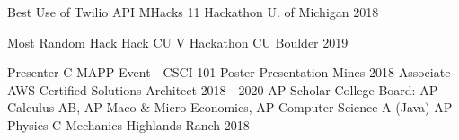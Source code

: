 

\begin{cvhonors}

  \cvhonor
    {Best Use of Twilio API} %
    {MHacks 11 Hackathon}
    {U. of Michigan} %
    {2018} %

  \cvhonor
    {Most Random Hack} %
    {Hack CU V Hackathon}
    {CU Boulder} %
    {2019} %

    \cvhonor
    {Presenter} %
    {C-MAPP Event - CSCI 101 Poster Presentation}
    {Mines} %
    {2018} %
  \cvhonor
    {Associate} %
    {AWS Certified Solutions Architect }
    {} %
    {2018 - 2020} %
    \cvhonor
    {AP Scholar} %
    {College Board: AP Calculus AB, AP Maco \& Micro Economics, AP
      Computer Science A (Java) AP Physics C Mechanics}
    {Highlands Ranch} %
    {2018} %
    
\end{cvhonors}
